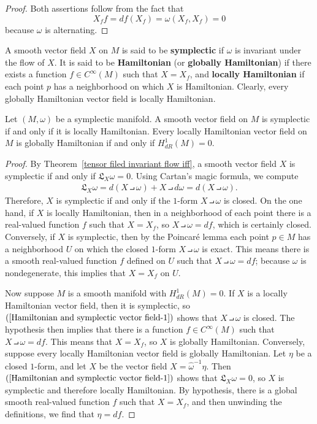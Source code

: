\begin{proof}
Both assertions follow from the fact that
\[X_ff=df(X_f)=\omega(X_f,X_f)=0\]
because $\omega$ is alternating.
\end{proof}
A smooth vector field $X$ on $M$ is said to be \textbf{symplectic} if $\omega$ is invariant under the flow of $X$. It is said to be \textbf{Hamiltonian} (or \textbf{globally Hamiltonian}) if there exists a function $f\in C^\infty(M)$ such that $X=X_f$, and \textbf{locally Hamiltonian} if each point $p$ has a neighborhood on which $X$ is Hamiltonian. Clearly, every globally Hamiltonian vector field is locally Hamiltonian.
\begin{proposition}\label{Hamiltonian and symplectic vector field}
Let $(M,\omega)$ be a symplectic manifold. A smooth vector field on $M$ is symplectic if and only if it is locally Hamiltonian. Every locally Hamiltonian vector field on $M$ is globally Hamiltonian if and only if $H^1_{dR}(M)=0$.
\end{proposition}
\begin{proof}
By Theorem~\ref{tensor filed invariant flow iff}, a smooth vector field $X$ is symplectic if and only if $\mathfrak{L}_X\omega=0$. Using Cartan’s magic formula, we compute
\begin{align}\label{Hamiltonian and symplectic vector field-1}
\mathfrak{L}_X\omega=d(X\intprod\omega)+X\intprod d\omega=d(X\intprod\omega).
\end{align}
Therefore, $X$ is symplectic if and only if the $1$-form $X\intprod\omega$ is closed. On the one hand, if $X$ is locally Hamiltonian, then in a neighborhood of each point there is a real-valued function $f$ such that $X=X_f$, so $X\intprod\omega=df$, which is certainly closed. Conversely, if $X$ is symplectic, then by the Poincar\'e lemma each point $p\in M$ has a neighborhood $U$ on which the closed $1$-form $X\intprod\omega$ is exact. This means there is a smooth real-valued function $f$ defined on $U$ such that $X\intprod\omega=df$; because $\omega$ is nondegenerate, this implies that $X=X_f$ on $U$.\par
Now suppose $M$ is a smooth manifold with $H^1_{dR}(M)=0$. If $X$ is a locally Hamiltonian vector field, then it is symplectic, so $(\ref{Hamiltonian and symplectic vector field-1})$ shows that $X\intprod\omega$ is closed. The hypothesis then implies that there is a function $f\in C^\infty(M)$ such that $X\intprod\omega=df$. This means that $X=X_f$, so $X$ is globally Hamiltonian. Conversely, suppose every locally Hamiltonian vector field is globally Hamiltonian. Let $\eta$ be a closed $1$-form, and let $X$ be the vector field $X=\widehat{\omega}^{-1}\eta$. Then $(\ref{Hamiltonian and symplectic vector field-1})$ shows that $\mathfrak{L}_X\omega=0$, so $X$ is symplectic and therefore locally Hamiltonian. By hypothesis, there is a global smooth real-valued function $f$ such that $X=X_f$, and then unwinding the definitions, we find that $\eta=df$.
\end{proof}
